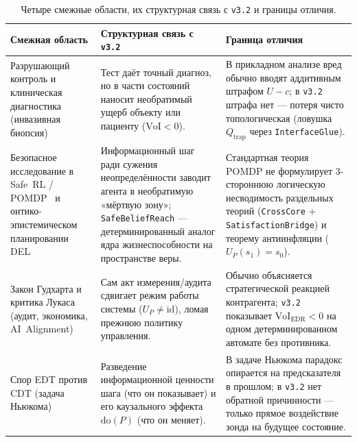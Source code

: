 \documentclass[10pt,a4paper]{article}
\theoremstyle{cleanthm}
\theoremstyle{cleandef}
\begin{document}
\begin{table}[!htbp]
\centering
\caption{Четыре смежные области, их структурная связь с \texttt{v3.2} и границы отличия.}
\label{tab:adjacent_domains}
\footnotesize
\begin{tabularx}{\linewidth}{@{}>{\raggedright\arraybackslash}p{38mm} >{\raggedright\arraybackslash}X >{\raggedright\arraybackslash}X@{}}
\toprule
\textbf{Смежная область} & \textbf{Структурная связь с \texttt{v3.2}} & \textbf{Граница отличия} \\
\midrule
Разрушающий контроль и клиническая диагностика (инвазивная биопсия) & Тест даёт точный диагноз, но в части состояний наносит необратимый ущерб объекту или пациенту ($\mathrm{VoI}<0$). & В прикладном анализе вред обычно вводят аддитивным штрафом $U-c$; в \texttt{v3.2} штрафа нет — потеря чисто топологическая (ловушка $Q_{\mathrm{trap}}$ через \texttt{InterfaceGlue}). \\
Безопасное исследование в Safe~RL / POMDP~\cite{bonet2000,moldovan2012,aubin1991} и онтико-эпистемическом планировании DEL~\cite{vanditmarsch2007,bolander2011} & Информационный шаг ради сужения неопределённости заводит агента в необратимую «мёртвую зону»; \texttt{SafeBeliefReach} — детерминированный аналог ядра жизнеспособности на пространстве веры. & Стандартная теория POMDP не формулирует 3-стороннюю логическую несводимость раздельных теорий (\texttt{CrossCore} + \texttt{Satisfaction\allowbreak Bridge}) и теорему антиинфляции ($U_P(s_1)=s_0$). \\
Закон Гудхарта и критика Лукаса (аудит, экономика, AI~Alignment) & Сам акт измерения/аудита сдвигает режим работы системы ($U_P\ne\mathrm{id}$), ломая прежнюю политику управления. & Обычно объясняется стратегической реакцией контрагента; \texttt{v3.2} показывает $\mathrm{VoI}_{\mathrm{EDR}}<0$ на одном детерминированном автомате без противника. \\
Спор EDT против CDT (задача Ньюкома) & Разведение информационной ценности шага (что он показывает) и его каузального эффекта $\mathrm{do}(P)$ (что он меняет). & В задаче Ньюкома парадокс опирается на предсказателя в прошлом; в \texttt{v3.2} нет обратной причинности — только прямое воздействие зонда на будущее состояние. \\
\bottomrule
\end{tabularx}
\end{table}
\end{document}
